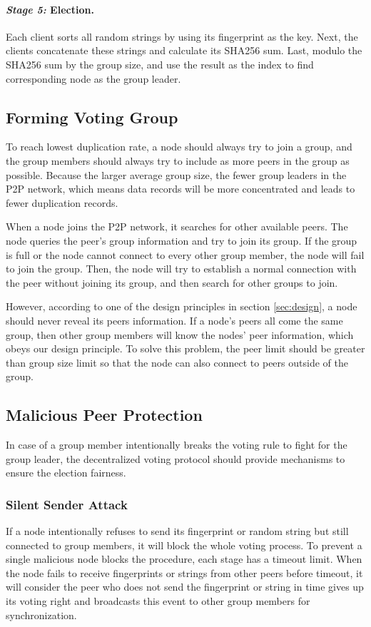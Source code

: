 \documentclass[twocolumn]{article}
\begin{document}
\paragraph{\textit{Stage 5:} Election.} Each client sorts all random strings by using its fingerprint as the key. Next, the clients concatenate these strings and calculate its SHA256 sum. Last, modulo the SHA256 sum by the group size, and use the result as the index to find corresponding node as the group leader.

\subsection{Forming Voting Group\label{sec:form}}
To reach lowest duplication rate, a node should always try to join a group, and the group members should always try to include as more peers in the group as possible. Because the larger average group size, the fewer group leaders in the P2P network, which means data records will be more concentrated and leads to fewer duplication records.

When a node joins the P2P network, it searches for other available peers. The node queries the peer's group information and try to join its group. If the group is full or the node cannot connect to every other group member, the node will fail to join the group. Then, the node will try to establish a normal connection with the peer without joining its group, and then search for other groups to join.

However, according to one of the design principles in section \ref{sec:design}, a node should never reveal its peers information. If a node's peers all come the same group, then other group members will know the nodes' peer information, which obeys our design principle. To solve this problem, the peer limit should be greater than group size limit so that the node can also connect to peers outside of the group.

\subsection{Malicious Peer Protection}
In case of a group member intentionally breaks the voting rule to fight for the group leader, the decentralized voting protocol should provide mechanisms to ensure the election fairness.

\subsubsection{Silent Sender Attack}
If a node intentionally refuses to send its fingerprint or random string but still connected to group members, it will block the whole voting process. To prevent a single malicious node blocks the procedure, each stage has a timeout limit. When the node fails to receive fingerprints or strings from other peers before timeout, it will consider the peer who does not send the fingerprint or string in time gives up its voting right and broadcasts this event to other group members for synchronization.
\end{document}
